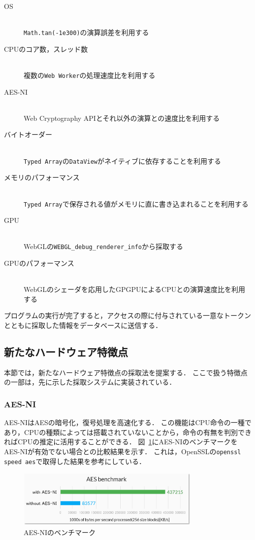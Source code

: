 \begin{description}
	\item[OS]\mbox{}\\
   	\texttt{Math.tan(-1e300)}の演算誤差を利用する~\cite{tor_mathtan}
    \item[CPUのコア数，スレッド数]\mbox{}\\
    複数の\texttt{Web Worker}の処理速度比を利用する~\cite{後藤浩行2013web,桐生直輝2014web}
    \item[AES-NI]\mbox{}\\
    Web Cryptography APIとそれ以外の演算との速度比を利用する
    \item[バイトオーダー]\mbox{}\\
    \texttt{Typed Array}の\texttt{DataView}がネイティブに依存することを利用する
    \item[メモリのパフォーマンス]\mbox{}\\
    \texttt{Typed Array}で保存される値がメモリに直に書き込まれることを利用する
    \item[GPU]\mbox{}\\
    WebGLの\texttt{WEBGL\_debug\_renderer\_info}から採取する~\cite{mowery2012pixel}
    \item[GPUのパフォーマンス]\mbox{}\\
    WebGLのシェーダを応用したGPGPUによるCPUとの演算速度比を利用する
\end{description}

プログラムの実行が完了すると，アクセスの際に付与されている一意なトークンとともに採取した情報をデータベースに送信する．

\subsection{新たなハードウェア特徴点}
本節では，新たなハードウェア特徴点の採取法を提案する．
ここで扱う特徴点の一部は，先に示した採取システムに実装されている．

\subsubsection{AES-NI}
AES-NIはAESの暗号化，復号処理を高速化する．
この機能はCPU命令の一種であり，CPUの種類によっては搭載されていないことから，命令の有無を判別できればCPUの推定に活用することができる．
図~\ref{fig-aes_ni}にAES-NIのベンチマークをAES-NIが有効でない場合との比較結果を示す．
これは，OpenSSLの\texttt{openssl speed aes}で取得した結果を参考にしている．

\begin{figure}[H]
	\centering
    \includegraphics[width=0.8\textwidth,pagebox=artbox]{fig/aes_ni.png}
    \caption{AES-NIのベンチマーク}
    \label{fig-aes_ni}
\end{figure}

